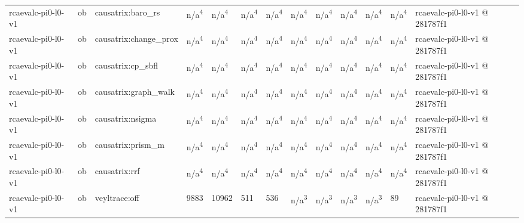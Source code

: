\begin{table}[t]
\begin{tabular}{lllllllllllll}
rcaevalc-pi0-l0-v1 & ob & causatrix:baro\_rs & n/a\textsuperscript{4} & n/a\textsuperscript{4} & n/a\textsuperscript{4} & n/a\textsuperscript{4} & n/a\textsuperscript{4} & n/a\textsuperscript{4} & n/a\textsuperscript{4} & n/a\textsuperscript{4} & n/a\textsuperscript{4} & rcaevalc-pi0-l0-v1 @ 281787f1 \\
rcaevalc-pi0-l0-v1 & ob & causatrix:change\_prox & n/a\textsuperscript{4} & n/a\textsuperscript{4} & n/a\textsuperscript{4} & n/a\textsuperscript{4} & n/a\textsuperscript{4} & n/a\textsuperscript{4} & n/a\textsuperscript{4} & n/a\textsuperscript{4} & n/a\textsuperscript{4} & rcaevalc-pi0-l0-v1 @ 281787f1 \\
rcaevalc-pi0-l0-v1 & ob & causatrix:cp\_sbfl & n/a\textsuperscript{4} & n/a\textsuperscript{4} & n/a\textsuperscript{4} & n/a\textsuperscript{4} & n/a\textsuperscript{4} & n/a\textsuperscript{4} & n/a\textsuperscript{4} & n/a\textsuperscript{4} & n/a\textsuperscript{4} & rcaevalc-pi0-l0-v1 @ 281787f1 \\
rcaevalc-pi0-l0-v1 & ob & causatrix:graph\_walk & n/a\textsuperscript{4} & n/a\textsuperscript{4} & n/a\textsuperscript{4} & n/a\textsuperscript{4} & n/a\textsuperscript{4} & n/a\textsuperscript{4} & n/a\textsuperscript{4} & n/a\textsuperscript{4} & n/a\textsuperscript{4} & rcaevalc-pi0-l0-v1 @ 281787f1 \\
rcaevalc-pi0-l0-v1 & ob & causatrix:nsigma & n/a\textsuperscript{4} & n/a\textsuperscript{4} & n/a\textsuperscript{4} & n/a\textsuperscript{4} & n/a\textsuperscript{4} & n/a\textsuperscript{4} & n/a\textsuperscript{4} & n/a\textsuperscript{4} & n/a\textsuperscript{4} & rcaevalc-pi0-l0-v1 @ 281787f1 \\
rcaevalc-pi0-l0-v1 & ob & causatrix:prism\_m & n/a\textsuperscript{4} & n/a\textsuperscript{4} & n/a\textsuperscript{4} & n/a\textsuperscript{4} & n/a\textsuperscript{4} & n/a\textsuperscript{4} & n/a\textsuperscript{4} & n/a\textsuperscript{4} & n/a\textsuperscript{4} & rcaevalc-pi0-l0-v1 @ 281787f1 \\
rcaevalc-pi0-l0-v1 & ob & causatrix:rrf & n/a\textsuperscript{4} & n/a\textsuperscript{4} & n/a\textsuperscript{4} & n/a\textsuperscript{4} & n/a\textsuperscript{4} & n/a\textsuperscript{4} & n/a\textsuperscript{4} & n/a\textsuperscript{4} & n/a\textsuperscript{4} & rcaevalc-pi0-l0-v1 @ 281787f1 \\
rcaevalc-pi0-l0-v1 & ob & veyltrace:off & 9883 & 10962 & 511 & 536 & n/a\textsuperscript{3} & n/a\textsuperscript{3} & n/a\textsuperscript{3} & n/a\textsuperscript{3} & 89 & rcaevalc-pi0-l0-v1 @ 281787f1 \\

\end{tabular}
\end{table}
